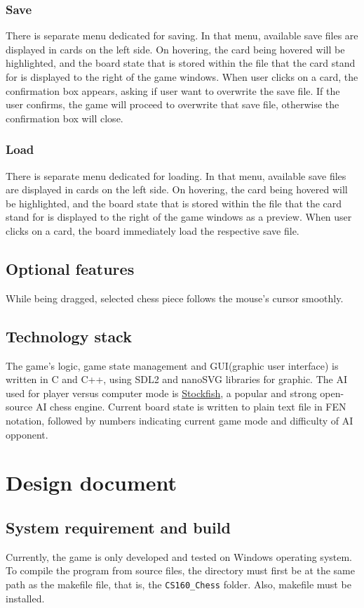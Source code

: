 \documentclass[a4paper, 10pt, titlepage]{report}
\begin{document}
\subsection{Save}
There is separate menu dedicated for saving. In that menu, available save files are displayed in cards on the left side. On hovering, the card being hovered will be highlighted, and the board state that is stored within the file that the card stand for is displayed to the right of the game windows. When user clicks on a card, the confirmation box appears, asking if user want to overwrite the save file. If the user confirms, the game will proceed to overwrite that save file, otherwise the confirmation box will close.
\subsection{Load}
There is separate menu dedicated for loading. In that menu, available save files are displayed in cards on the left side. On hovering, the card being hovered will be highlighted, and the board state that is stored within the file that the card stand for is displayed to the right of the game windows as a preview. When user clicks on a card, the board immediately load the respective save file.
\section{Optional features}
While being dragged, selected chess piece follows the mouse's cursor smoothly.
\section{Technology stack}
The game's logic, game state management and GUI(graphic user interface) is written in C and C++, using SDL2 and nanoSVG libraries for graphic. The AI used for player versus computer mode is \href{https://github.com/official-stockfish/Stockfish}{Stockfish}, a popular and strong open-source AI chess engine. Current board state is written to plain text file in FEN notation, followed by numbers indicating current game mode and difficulty of AI opponent.
\chapter{Design document}
\section{System requirement and build}
Currently, the game is only developed and tested on Windows operating system.
To compile the program from source files, the directory must first be at the same path as the makefile file, that is, the \texttt{CS160\_Chess} folder. Also, makefile must be installed.
\end{document}
